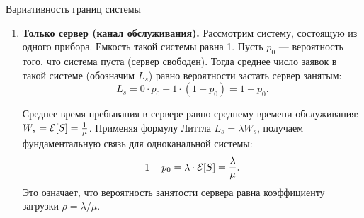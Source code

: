 \begin{example}{Вариативность границ системы}
\begin{enumerate}
\begin{center}
    \end{center}
    Среднее число заявок в очереди $L_q$ связано со средним временем ожидания $W_q$ соотношением:
    $$ L_q = \lambda \cdot W_q. $$

    \item \textbf{Только сервер (канал обслуживания).}
    Рассмотрим систему, состоящую из одного прибора. Емкость такой системы равна 1. Пусть $p_0$ — вероятность того, что система пуста (сервер свободен). Тогда среднее число заявок в такой системе (обозначим $L_s$) равно вероятности застать сервер занятым:
    $$ L_s = 0 \cdot p_0 + 1 \cdot (1 - p_0) = 1 - p_0. $$
    
    \begin{center}
    \end{center}
    
    Среднее время пребывания в сервере равно среднему времени обслуживания: $W_s = \mathcal{E}[S] = \frac{1}{\mu}$.
    Применяя формулу Литтла $L_s = \lambda W_s$, получаем фундаментальную связь для одноканальной системы:
    $$ 1 - p_0 = \lambda \cdot \mathcal{E}[S] = \frac{\lambda}{\mu}. $$
    Это означает, что вероятность занятости сервера равна коэффициенту загрузки $\rho = \lambda / \mu$.
\end{enumerate}
\end{example}


